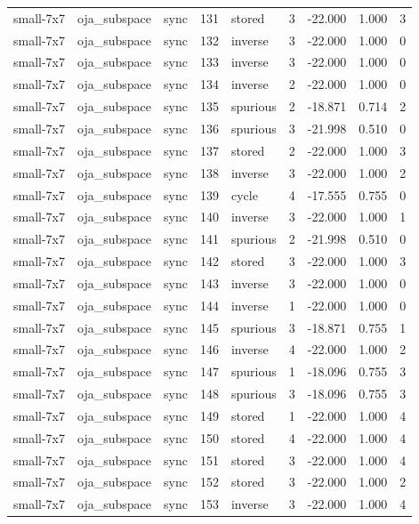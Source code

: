 \begin{tabular}{lllrlrrrr}
small-7x7 & oja\_subspace & sync & 131 & stored & 3 & -22.000 & 1.000 & 3 \\
small-7x7 & oja\_subspace & sync & 132 & inverse & 3 & -22.000 & 1.000 & 0 \\
small-7x7 & oja\_subspace & sync & 133 & inverse & 3 & -22.000 & 1.000 & 0 \\
small-7x7 & oja\_subspace & sync & 134 & inverse & 2 & -22.000 & 1.000 & 0 \\
small-7x7 & oja\_subspace & sync & 135 & spurious & 2 & -18.871 & 0.714 & 2 \\
small-7x7 & oja\_subspace & sync & 136 & spurious & 3 & -21.998 & 0.510 & 0 \\
small-7x7 & oja\_subspace & sync & 137 & stored & 2 & -22.000 & 1.000 & 3 \\
small-7x7 & oja\_subspace & sync & 138 & inverse & 3 & -22.000 & 1.000 & 2 \\
small-7x7 & oja\_subspace & sync & 139 & cycle & 4 & -17.555 & 0.755 & 0 \\
small-7x7 & oja\_subspace & sync & 140 & inverse & 3 & -22.000 & 1.000 & 1 \\
small-7x7 & oja\_subspace & sync & 141 & spurious & 2 & -21.998 & 0.510 & 0 \\
small-7x7 & oja\_subspace & sync & 142 & stored & 3 & -22.000 & 1.000 & 3 \\
small-7x7 & oja\_subspace & sync & 143 & inverse & 3 & -22.000 & 1.000 & 0 \\
small-7x7 & oja\_subspace & sync & 144 & inverse & 1 & -22.000 & 1.000 & 0 \\
small-7x7 & oja\_subspace & sync & 145 & spurious & 3 & -18.871 & 0.755 & 1 \\
small-7x7 & oja\_subspace & sync & 146 & inverse & 4 & -22.000 & 1.000 & 2 \\
small-7x7 & oja\_subspace & sync & 147 & spurious & 1 & -18.096 & 0.755 & 3 \\
small-7x7 & oja\_subspace & sync & 148 & spurious & 3 & -18.096 & 0.755 & 3 \\
small-7x7 & oja\_subspace & sync & 149 & stored & 1 & -22.000 & 1.000 & 4 \\
small-7x7 & oja\_subspace & sync & 150 & stored & 4 & -22.000 & 1.000 & 4 \\
small-7x7 & oja\_subspace & sync & 151 & stored & 3 & -22.000 & 1.000 & 4 \\
small-7x7 & oja\_subspace & sync & 152 & stored & 3 & -22.000 & 1.000 & 2 \\
small-7x7 & oja\_subspace & sync & 153 & inverse & 3 & -22.000 & 1.000 & 4 \\

\end{tabular}
